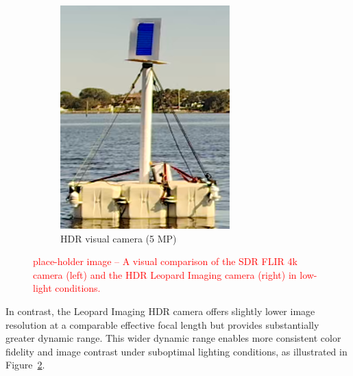 \documentclass{erauthesis}
\begin{document}
\begin{figure}[htbp]
{\begin{subfigure}[t]{0.378\textwidth}
        \includegraphics[width=\textwidth]{Images/HDR_bright.png}
        \caption{HDR visual camera (5 MP)}
        \label{fig:HDR_bright}
    \end{subfigure}%
}
\caption{\textcolor{red}{place-holder image – A visual comparison of the \ac{SDR} FLIR 4k camera (left) and the \ac{HDR} Leopard Imaging camera (right) in low-light conditions.}}
\label{fig:HDR_compare}
\end{figure}

In contrast, the Leopard Imaging \ac{HDR} camera offers slightly lower image resolution at a comparable effective focal length but provides substantially greater dynamic range.
This wider dynamic range enables more consistent color fidelity and image contrast under suboptimal lighting conditions, as illustrated in Figure~\ref{fig:HDR_compare}.
\end{document}
